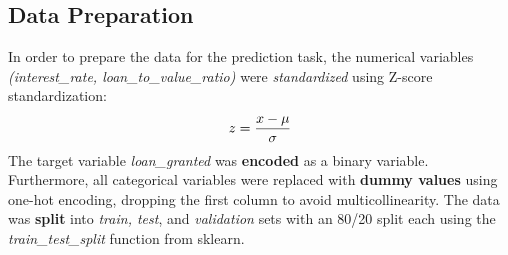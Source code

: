 \subsection{Data Preparation}\label{subsec:Data_Preparation}

In order to prepare the data for the prediction task, the numerical variables \textit{(interest\_rate, loan\_to\_value\_ratio)} were \textit{standardized} using Z-score standardization: 
\begin{equation}
    z = \frac{x - \mu}{\sigma}
    \label{eq:Z-Score Standardization}
    \addcontentsline{frm}{formulas}{\protect\numberline{\theequation}\hspace{1em}Z-Score Standardization}
\end{equation}
The target variable \textit{loan\_granted} was \textbf{encoded} as a binary variable. Furthermore, all categorical variables were replaced with \textbf{dummy values} using one-hot encoding, dropping the first column to avoid multicollinearity.
The data was \textbf{split} into \textit{train, test}, and \textit{validation} sets with an 80/20 split each using the \textit{train\_test\_split} function from sklearn.